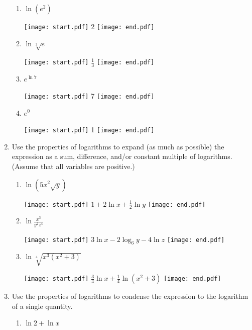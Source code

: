 \documentclass[12pt]{article}
\begin{document}
\begin{enumerate}
\begin{enumerate}
\item $\ln(e^2)$

\texttt{[image: start.pdf]}
{2}
\texttt{[image: end.pdf]}


\item $\ln{\sqrt[3]{e}}$

\texttt{[image: start.pdf]}
{$\frac{1}{3}$}
\texttt{[image: end.pdf]}


\item $e^{\ln{7}}$

\texttt{[image: start.pdf]}
{7}
\texttt{[image: end.pdf]}


\item $e^0$

\texttt{[image: start.pdf]}
{1}
\texttt{[image: end.pdf]}


\end{enumerate}

\item Use the properties of logarithms to expand (as much as possible) the expression as a sum, difference, and/or constant multiple of logarithms.  (Assume that all variables are positive.)

\begin{enumerate}

\item $\displaystyle \ln{(5x^{2}\sqrt{y})}$

\texttt{[image: start.pdf]}
{$\displaystyle 1+2\ln{x}+\frac{1}{2}\ln{y}$}
\texttt{[image: end.pdf]}


\item $\displaystyle \ln{\frac{x^3}{y^2z^4}}$

\texttt{[image: start.pdf]}
{$\displaystyle 3\ln{x}-2\log_{6}{y}-4\ln{z}$}
\texttt{[image: end.pdf]}


\item $\displaystyle \ln{\sqrt[4]{x^{3}(x^{2}+3)}}$

\texttt{[image: start.pdf]}
{$\displaystyle \frac{3}{4}\ln{x}+\frac{1}{4}\ln{(x^{2}+3)}$}
\texttt{[image: end.pdf]}


\end{enumerate}

\item Use the properties of logarithms to condense the expression to the logarithm of a single quantity.

\begin{enumerate}

\item $\displaystyle \ln{2}+\ln{x}$


\end{enumerate}
\end{enumerate}
\end{document}
